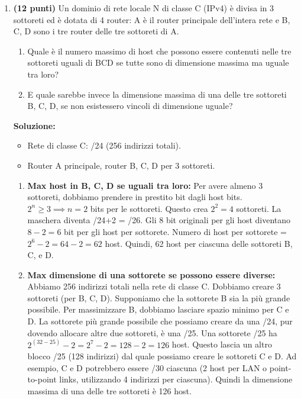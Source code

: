 \documentclass[12pt,a4paper]{article}
\begin{document}
\begin{enumerate}[label=\textbf{\arabic*.}, wide, labelindent=0pt, leftmargin=*]
    \item \textbf{(12 punti)} Un dominio di rete locale N di classe C (IPv4) è divisa in 3 sottoreti ed è dotata di 4 router: A è il router principale dell'intera rete e B, C, D sono i tre router delle tre sottoreti di A.
    \begin{enumerate}[label=\alph*)]
        \item Quale è il numero massimo di host che possono essere contenuti nelle tre sottoreti uguali di BCD se tutte sono di dimensione massima ma uguale tra loro?
        \item E quale sarebbe invece la dimensione massima di una delle tre sottoreti B, C, D, se non esistessero vincoli di dimensione uguale?
    \end{enumerate}
    \textbf{Soluzione:}
    \begin{itemize}
        \item Rete di classe C: /24 (256 indirizzi totali).
        \item Router A principale, router B, C, D per 3 sottoreti.
    \end{itemize}
    \begin{enumerate}[label=\alph*), wide, labelindent=0pt, leftmargin=*]
        \item \textbf{Max host in B, C, D se uguali tra loro:}
        Per avere almeno 3 sottoreti, dobbiamo prendere in prestito bit dagli host bits.
        $2^n \ge 3 \implies n=2$ bits per le sottoreti. Questo crea $2^2=4$ sottoreti.
        La maschera diventa /24+2 = /26.
        Gli 8 bit originali per gli host diventano $8-2=6$ bit per gli host per sottorete.
        Numero di host per sottorete = $2^6 - 2 = 64 - 2 = 62$ host.
        Quindi, 62 host per ciascuna delle sottoreti B, C, e D.

        \item \textbf{Max dimensione di una sottorete se possono essere diverse:}
        Abbiamo 256 indirizzi totali nella rete di classe C. Dobbiamo creare 3 sottoreti (per B, C, D).
        Supponiamo che la sottorete B sia la più grande possibile. Per massimizzare B, dobbiamo lasciare spazio minimo per C e D.
        La sottorete più grande possibile che possiamo creare da una /24, pur dovendo allocare altre due sottoreti, è una /25.
        Una sottorete /25 ha $2^{(32-25)} - 2 = 2^7 - 2 = 128 - 2 = 126$ host.
        Questo lascia un altro blocco /25 (128 indirizzi) dal quale possiamo creare le sottoreti C e D.
        Ad esempio, C e D potrebbero essere /30 ciascuna (2 host per LAN o point-to-point links, utilizzando 4 indirizzi per ciascuna).
        Quindi la dimensione massima di una delle tre sottoreti è 126 host.
    \end{enumerate}


\end{enumerate}
\end{document}
